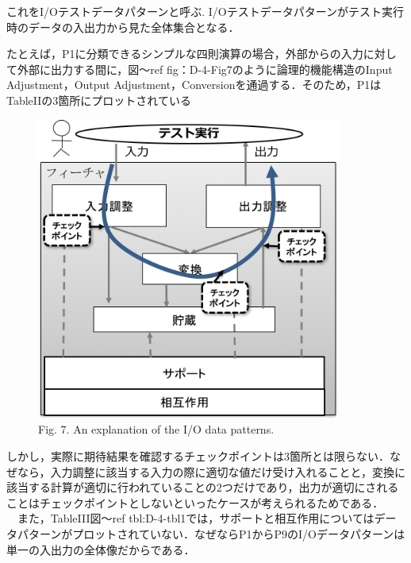 \documentclass[a4paper,12pt]{jreport}
\begin{document}
これをI/Oテストデータパターンと呼ぶ.
I/Oテストデータパターンがテスト実行時のデータの入出力から見た全体集合となる．



たとえば，P1に分類できるシンプルな四則演算の場合，外部からの入力に対して外部に出力する間に，図〜ref {fig：D-4-Fig7}のように論理的機能構造のInput Adjustment，Output Adjustment，Conversionを通過する．そのため，P1はTableIIの3箇所にプロットされている

   \begin{figure}[htbp]
  \begin{center}
  \includegraphics[width=10cm]{./image/D-4-Fig7.png}
  \caption{Fig. 7. An explanation of the I/O data patterns.}
  \label{fig:D-4-Fig7}
  \end{center}
   \end{figure}

しかし，実際に期待結果を確認するチェックポイントは3箇所とは限らない．なぜなら，入力調整に該当する入力の際に適切な値だけ受け入れることと，変換に該当する計算が適切に行われていることの2つだけであり，出力が適切にされることはチェックポイントとしないといったケースが考えられるためである．
　また，TableIII図〜ref {tbl:D-4-tbl1}では，サポートと相互作用についてはデータパターンがプロットされていない．なぜならP1からP9のI/Oデータパターンは単一の入出力の全体像だからである．
\end{document}

